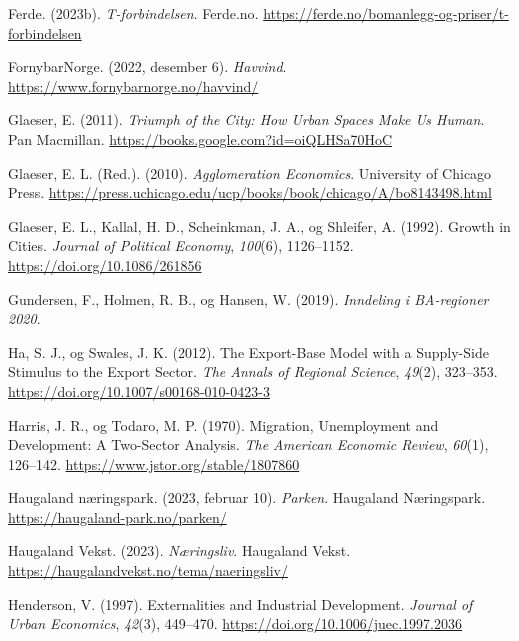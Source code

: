 \documentclass[
]{article}
\newlength{\cslhangindent}
\newlength{\cslentryspacingunit} %
\newenvironment{CSLReferences}[2] %
 {%
  \setlength{\parindent}{0pt}
  \ifodd #1
  \let\oldpar\par
  \def\par{\hangindent=\cslhangindent\oldpar}
  \fi
  \setlength{\parskip}{#2\cslentryspacingunit}
 }%
 {}
\begin{document}
\begin{CSLReferences}{1}{0}
\leavevmode{}%
Ferde. (2023b). \emph{T-forbindelsen}. {Ferde.no}.
\url{https://ferde.no/bomanlegg-og-priser/t-forbindelsen}

\leavevmode{}%
FornybarNorge. (2022, desember 6). \emph{Havvind}.
\url{https://www.fornybarnorge.no/havvind/}

\leavevmode{}%
Glaeser, E. (2011). \emph{Triumph of the {City}: {How Urban Spaces Make
Us Human}}. {Pan Macmillan}.
\url{https://books.google.com?id=oiQLHSa70HoC}

\leavevmode{}%
Glaeser, E. L. (Red.). (2010). \emph{Agglomeration {Economics}}.
{University of Chicago Press}.
\url{https://press.uchicago.edu/ucp/books/book/chicago/A/bo8143498.html}

\leavevmode{}%
Glaeser, E. L., Kallal, H. D., Scheinkman, J. A., og Shleifer, A.
(1992). Growth in {Cities}. \emph{Journal of Political Economy},
\emph{100}(6), 1126--1152. \url{https://doi.org/10.1086/261856}

\leavevmode{}%
Gundersen, F., Holmen, R. B., og Hansen, W. (2019). \emph{Inndeling i
BA-regioner 2020}.

\leavevmode{}%
Ha, S. J., og Swales, J. K. (2012). The Export-Base Model with a
Supply-Side Stimulus to the Export Sector. \emph{The Annals of Regional
Science}, \emph{49}(2), 323--353.
\url{https://doi.org/10.1007/s00168-010-0423-3}

\leavevmode{}%
Harris, J. R., og Todaro, M. P. (1970). Migration, {Unemployment} and
{Development}: {A Two-Sector Analysis}. \emph{The American Economic
Review}, \emph{60}(1), 126--142.
\url{https://www.jstor.org/stable/1807860}

\leavevmode{}%
Haugaland næringspark. (2023, februar 10). \emph{Parken}. {Haugaland
Næringspark}. \url{https://haugaland-park.no/parken/}

\leavevmode{}%
Haugaland Vekst. (2023). \emph{Næringsliv}. {Haugaland Vekst}.
\url{https://haugalandvekst.no/tema/naeringsliv/}

\leavevmode{}%
Henderson, V. (1997). Externalities and {Industrial Development}.
\emph{Journal of Urban Economics}, \emph{42}(3), 449--470.
\url{https://doi.org/10.1006/juec.1997.2036}


\end{CSLReferences}
\end{document}
